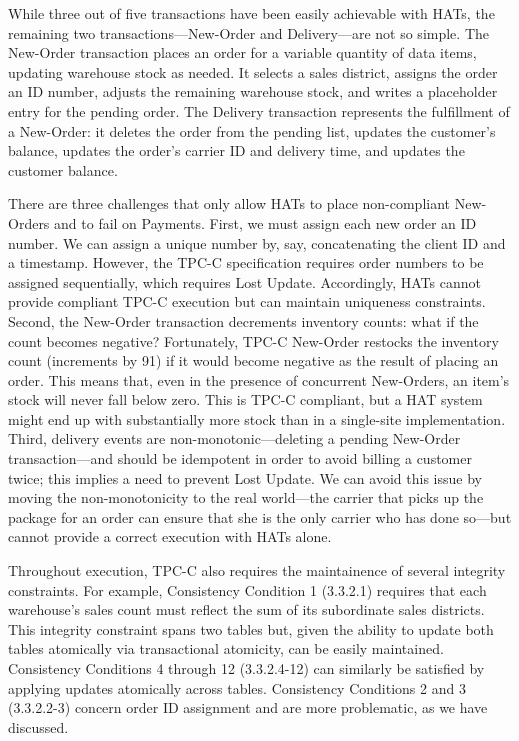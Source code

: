 While three out of five transactions have been easily achievable with
HATs, the remaining two transactions---New-Order and Delivery---are
not so simple. The New-Order transaction places an order for a
variable quantity of data items, updating warehouse stock as
needed. It selects a sales district, assigns the order an ID number,
adjusts the remaining warehouse stock, and writes a placeholder entry
for the pending order. The Delivery transaction represents the
fulfillment of a New-Order: it deletes the order from the pending
list, updates the customer's balance, updates the order's carrier ID
and delivery time, and updates the customer balance.

There are three challenges that only allow HATs to place non-compliant
New-Orders and to fail on Payments. First, we must assign each new
order an ID number. We can assign a unique number by, say,
concatenating the client ID and a timestamp. However, the TPC-C
specification requires order numbers to be assigned sequentially,
which requires Lost Update. Accordingly, HATs cannot provide compliant
TPC-C execution but can maintain uniqueness constraints. Second, the
New-Order transaction decrements inventory counts: what if the count
becomes negative? Fortunately, TPC-C New-Order restocks the inventory
count (increments by 91) if it would become negative as the result of
placing an order. This means that, even in the presence of concurrent
New-Orders, an item's stock will never fall below zero. This is TPC-C
compliant, but a HAT system might end up with substantially more stock
than in a single-site implementation. Third, delivery events are
non-monotonic---deleting a pending New-Order transaction---and should
be idempotent in order to avoid billing a customer twice; this implies
a need to prevent Lost Update. We can avoid this issue by moving the
non-monotonicity to the real world---the carrier that picks up the
package for an order can ensure that she is the only carrier who has
done so---but cannot provide a correct execution with HATs alone.

Throughout execution, TPC-C also requires the maintainence of several
integrity constraints. For example, Consistency Condition 1 (3.3.2.1)
requires that each warehouse's sales count must reflect the sum of its
subordinate sales districts. This integrity constraint spans two
tables but, given the ability to update both tables atomically via
transactional atomicity, can be easily maintained. Consistency
Conditions 4 through 12 (3.3.2.4-12) can similarly be satisfied by
applying updates atomically across tables. Consistency Conditions 2
and 3 (3.3.2.2-3) concern order ID assignment and are more
problematic, as we have discussed.


